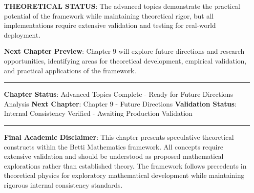 \textbf{THEORETICAL STATUS}: The advanced topics demonstrate the practical potential of the framework while maintaining theoretical rigor, but all implementations require extensive validation and testing for real-world deployment.

\textbf{Next Chapter Preview}: Chapter 9 will explore future directions and research opportunities, identifying areas for theoretical development, empirical validation, and practical applications of the framework.

\hrule

\textbf{Chapter Status}: Advanced Topics Complete - Ready for Future Directions Analysis  
\textbf{Next Chapter}: Chapter 9 - Future Directions  
\textbf{Validation Status}: Internal Consistency Verified - Awaiting Production Validation

\hrule

\textbf{Final Academic Disclaimer}: This chapter presents speculative theoretical constructs within the Betti Mathematics framework. All concepts require extensive validation and should be understood as proposed mathematical explorations rather than established theory. The framework follows precedents in theoretical physics for exploratory mathematical development while maintaining rigorous internal consistency standards.